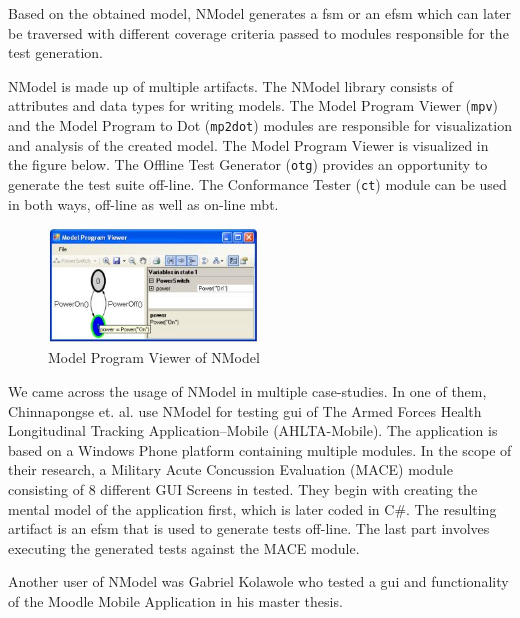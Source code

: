 \par
Based on the obtained model, NModel generates a \acrshort{fsm} or an \acrshort{efsm} which can later be traversed with different coverage criteria passed to modules responsible for the test generation.

\par
NModel is made up of multiple artifacts. The NModel library consists of attributes and data types for writing models. The Model Program Viewer (\texttt{mpv}) and the Model Program to Dot (\texttt{mp2dot}) modules are responsible for visualization and analysis of the created model. The Model Program Viewer is visualized in the figure below. The Offline Test Generator (\texttt{otg}) provides an opportunity to generate the test suite off-line. The Conformance Tester (\texttt{ct}) module can be used in both ways, off-line as well as on-line \acrshort{mbt}.

\begin{figure} [htbp!]
	\centering
					\includegraphics[width=0.5\textwidth]{figures/NModel_mpv.JPG}
					\caption{\label{Fig:NModel_mpv} Model Program Viewer of NModel}
\end{figure}


\par
We came across the usage of NModel in multiple case-studies. In one of them, Chinnapongse et. al. \cite{Chinnapongse_NModel} use NModel for testing \acrshort{gui} of The Armed Forces Health Longitudinal Tracking Application–Mobile (AHLTA-Mobile). The application is based on a Windows Phone platform containing multiple modules. In the scope of their research, a Military Acute Concussion Evaluation (MACE) module consisting of 8 different GUI Screens in tested. They begin with creating the mental model of the application first, which is later coded in C\#. The resulting artifact is an \acrshort{efsm} that is used to generate tests off-line. The last part involves executing the generated tests against the MACE module.
\par
Another user of NModel was Gabriel Kolawole \cite{Kolawole_NModel} who tested a \acrshort{gui} and functionality of the Moodle Mobile Application in his master thesis.

